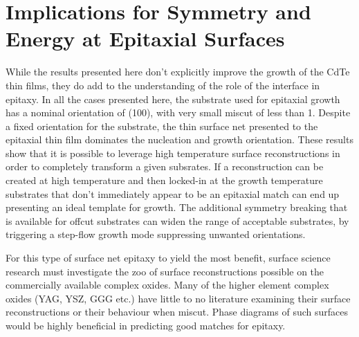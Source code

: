 \section{Implications for Symmetry and Energy at Epitaxial Surfaces}
While the results presented here don't explicitly improve the growth of the CdTe thin films, they do add to the understanding of the role of the interface in epitaxy. In all the cases presented here, the substrate used for epitaxial growth has a nominal orientation of (100), with very small miscut of less than 1\degree. Despite a fixed orientation for the substrate, the thin surface net presented to the epitaxial thin film dominates the nucleation and growth orientation. These results show that it is possible to leverage high temperature surface reconstructions in order to completely transform a given subsrates. If a reconstruction can be created at high temperature and then locked-in at the growth temperature substrates that don't immediately appear to be an epitaxial match can end up presenting an ideal template for growth. The additional symmetry breaking that is available for offcut substrates can widen the range of acceptable substrates, by triggering a step-flow growth mode suppressing unwanted orientations.

For this type of surface net epitaxy to yield the most benefit, surface science research must investigate the zoo of surface reconstructions possible on the commercially available complex oxides. Many of the higher element complex oxides (YAG, YSZ, GGG etc.) have little to no literature examining their surface reconstructions or their behaviour when miscut. Phase diagrams of such surfaces would be highly beneficial in predicting good matches for epitaxy.